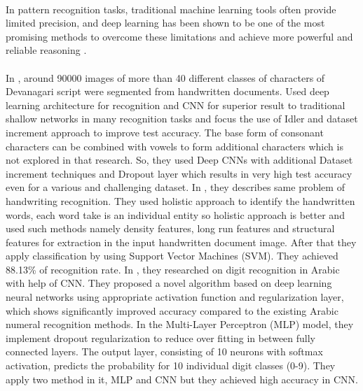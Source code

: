 \documentclass[a4paper,12pt]{report}
\begin{document}
\paragraph{}
In pattern recognition tasks, traditional machine learning tools often provide limited precision, and deep learning has been shown to be one of the most promising methods to overcome these limitations and achieve more powerful and reliable reasoning \cite{Lane}. 

\paragraph{}
In \cite{Jane}, around 90000 images of more than 40 different classes of characters of Devanagari script were segmented from handwritten documents. Used deep learning architecture for recognition and CNN for superior result to traditional shallow networks in many recognition tasks and focus the use of Idler and dataset increment approach to improve test accuracy. The base form of consonant characters can be combined with vowels to form additional characters which is not explored in that research. So, they used Deep CNNs with additional Dataset increment techniques and Dropout layer which results in very high test accuracy even for a various and challenging dataset. In \cite{Shruthi}, they describes same problem of handwriting recognition. They used holistic approach to identify the handwritten words, each word take is an individual entity so holistic approach is better and used such methods namely density features, long run features and structural features for extraction in the input handwritten document image. After that they apply classification by using Support Vector Machines (SVM). They achieved 88.13\% of recognition rate. In \cite{Akm}, they researched on digit recognition in Arabic with help of CNN. They proposed a novel algorithm based on deep learning neural networks using appropriate activation function and regularization layer, which shows significantly improved accuracy compared to the existing Arabic numeral recognition methods. In the Multi-Layer Perceptron (MLP) model, they implement dropout regularization to reduce over fitting in between fully connected layers. The output layer, consisting of 10 neurons with softmax activation, predicts the probability for 10 individual digit classes (0-9). They apply two method in it, MLP and CNN but they achieved high accuracy in CNN. 
\end{document}
